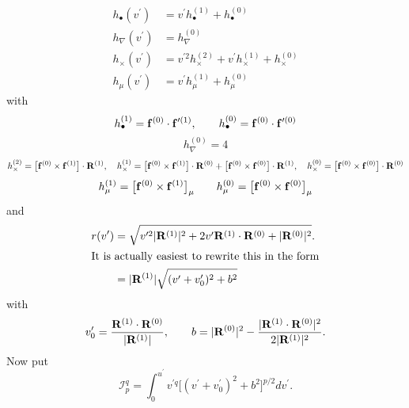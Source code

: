 \documentclass[dvips,letterpaper]{article}
\begin{document}
\begin{align*}
  h_\bullet(v^\prime) 
&= v^\prime h_\bullet^{(1)} + h_\bullet^{(0)}
\\
  h_\nabla(v^\prime) 
&= h_\nabla^{(0)}
\\
  h_\times(v^\prime) 
&= v^{\prime 2} h_\times^{(2)} + v^{\prime} h_\times^{(1)} + h_\times^{(0)}
\\
  h_\mu(v^\prime) 
&= v^{\prime} h_\mu^{(1)} + h_\mu^{(0)}
\end{align*}
with 
$$
h_\bullet^{(1)}
= \mathbf{f}^{(0)} \cdot \mathbf{f}^{\prime(1)}, 
\qquad 
h_\bullet^{(0)}
= \mathbf{f}^{(0)} \cdot \mathbf{f}^{\prime(0)}
$$
$$
h_\nabla^{(0)}
=4
$$
$$
h_\times^{(2)}
= \big[\mathbf{f}^{(0)} \times \mathbf{f}^{(1)}\big] \cdot \mathbf{R}^{(1)}, 
\quad
h_\times^{(1)}
=
    \big[\mathbf{f}^{(0)} \times \mathbf{f}^{(1)}\big] \cdot \mathbf{R}^{(0)}
   +\big[\mathbf{f}^{(0)} \times \mathbf{f}^{(0)}\big] \cdot \mathbf{R}^{(1)}, 
\quad
h_\times^{(0)}
=
    \big[\mathbf{f}^{(0)} \times \mathbf{f}^{(0)}\big] \cdot \mathbf{R}^{(0)}
$$
$$
h_\mu^{(1)}
=\big[\mathbf{f}^{(0)} \times \mathbf{f}^{(1)}\big]_\mu
\qquad
h_\mu^{(0)}
=\big[\mathbf{f}^{(0)} \times \mathbf{f}^{(0)}\big]_\mu
$$
and
\begin{align*}
 r(v^\prime) 
&= \sqrt{ v^{\prime 2} |\mathbf{R}^{(1)}|^2 
         +2v^{\prime}   \mathbf{R}^{(1)}\cdot \mathbf{R}^{(0)}
         +|\mathbf{R}^{(0)}|^2
        }.
\\
\intertext{It is actually easiest to rewrite this in the form}
&= |\mathbf{R}^{(1)}| \sqrt{ (v^\prime + v_0^\prime)^2 + b^2 }
\end{align*}
with
$$
v_0^\prime = \frac{ \mathbf{R}^{(1)} \cdot \mathbf{R}^{(0)} } {|\mathbf{R}^{(1)}|}, 
\qquad
b = |\mathbf{R}^{(0)}|^2 -\frac{|\mathbf{R}^{(1)} \cdot \mathbf{R}^{(0)}|^2}{2|\mathbf{R}^{(1)}|^2}.
$$
Now put 
$$ \mathcal{I}^q_p=
   \int_0^{u^\prime} 
    v^{\prime q} \Big[(v^\prime + v_0^\prime)^2 + b^2\Big]^{p/2} dv^\prime.
$$
\end{document}
